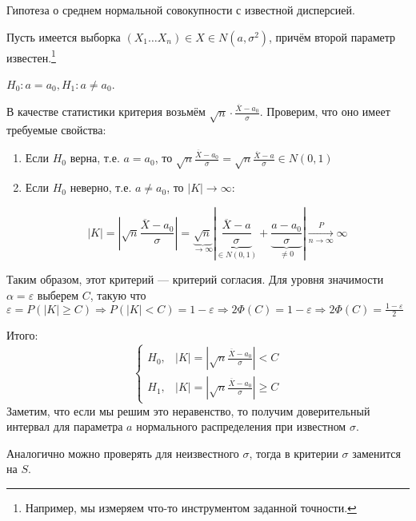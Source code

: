 \begin{exercise*}
    Гипотеза о среднем нормальной совокупности с известной дисперсией.

    Пусть имеется выборка \((X_1 \dots X_n) \in X \in N(a, \sigma^2)\), причём второй параметр известен.\footnote{Например, мы измеряем что-то инструментом заданной точности.}

    \(H_0: a = a_0, H_1 : a \neq a_0\).

    В качестве статистики критерия возьмём \(\sqrt{n} \cdot \frac{ \overline{X} - a_0}{\sigma}\). Проверим, что оно имеет требуемые свойства:
    \begin{enumerate}
        \item Если \(H_0\) верна, т.е. \(a = a_0\), то \(\sqrt{n} \frac{ \overline{X} - a_0}{\sigma} = \sqrt{n} \frac{ \overline{X} - a}{\sigma} \in N(0, 1)\)
        \item Если \(H_0\) неверно, т.е. \(a \neq a_0\), то \(|K| \to \infty \):

              \[|K| = \left|\sqrt{n} \frac{ \overline{X} - a_0}{\sigma}\right|= \underbrace{\sqrt{n}}_{ \to \infty } \left|\underbrace{\frac{ \overline{X} - a}{\sigma}}_{\in N(0, 1)} + \underbrace{\frac{a - a_0}{\sigma}}_{\neq 0}\right| \xrightarrow[n \to \infty ]{P} \infty\]
    \end{enumerate}

    Таким образом, этот критерий --- критерий согласия. Для уровня значимости \(\alpha = \varepsilon\) выберем \(C\), такую что \(\varepsilon = P(|K| \geq C) \Rightarrow P(|K| < C) = 1 - \varepsilon \Rightarrow 2 \Phi(C) = 1 - \varepsilon \Rightarrow 2 \Phi(C) = \frac{1 - \varepsilon}{2}\)

    Итого:
    \[\begin{cases}
            H_0, & |K| = \left|\sqrt{n} \frac{ \overline{X} - a_0}{\sigma}\right| < C    \\
            H_1, & |K| = \left|\sqrt{n} \frac{ \overline{X} - a_0}{\sigma}\right| \geq C
        \end{cases}\]
    Заметим, что если мы решим это неравенство, то получим доверительный интервал для параметра \(a\) нормального распределения при известном \(\sigma\).
\end{exercise*}

\begin{remark}
    Аналогично можно проверять для неизвестного \(\sigma\), тогда в критерии \(\sigma\) заменится на \(S\).
\end{remark}


